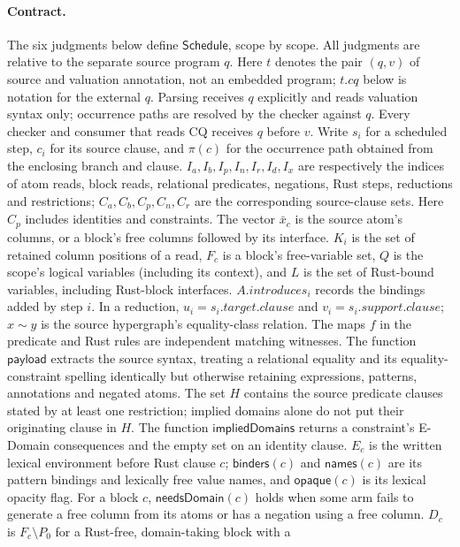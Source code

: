 \paragraph{Contract.}
The six judgments below define $\mathsf{Schedule}$, scope by scope.
All judgments are relative to the separate source program $q$.
Here $t$ denotes the pair $(q,v)$ of source and valuation annotation, not
an embedded program; $t.cq$ below is notation for the external $q$.
Parsing receives $q$ explicitly and reads valuation syntax only; occurrence
paths are resolved by the checker against $q$.
Every checker and consumer that reads CQ receives $q$ before $v$.
Write $s_i$ for a scheduled step, $c_i$ for its source clause, and
$\pi(c)$ for the occurrence path obtained from the enclosing branch and clause.
$I_a,I_b,I_p,I_n,I_r,I_d,I_x$ are respectively the indices of atom reads,
block reads, relational predicates, negations, Rust steps, reductions and
restrictions; $C_a,C_b,C_p,C_n,C_r$ are the corresponding source-clause sets.
Here $C_p$ includes identities and constraints. The vector $\bar x_c$ is the
source atom's columns, or a block's free columns followed by its interface.
$K_i$ is the set of retained column positions of a read, $F_c$ is a block's
free-variable set, $Q$ is the scope's logical variables (including its context),
and $L$ is the set of Rust-bound variables, including Rust-block interfaces.
$A.introduces_i$ records the bindings added by step $i$.
In a reduction, $u_i=s_i.target.clause$ and $v_i=s_i.support.clause$;
$x\sim y$ is the source hypergraph's equality-class relation.
The maps $f$ in the predicate and Rust rules are independent matching witnesses.
The function $\mathsf{payload}$ extracts the source syntax, treating a
relational equality and its equality-constraint spelling identically but
otherwise retaining expressions, patterns, annotations and negated atoms.
The set $H$ contains the source predicate clauses stated by at least one
restriction; implied domains alone do not put their originating clause in $H$.
The function $\mathsf{impliedDomains}$ returns a constraint's E-Domain
consequences and the empty set on an identity clause.
$E_c$ is the written lexical environment before Rust clause $c$;
$\mathsf{binders}(c)$ and $\mathsf{names}(c)$ are its pattern bindings and
lexically free value names, and $\mathsf{opaque}(c)$ is its lexical opacity flag.
For a block $c$, $\mathsf{needsDomain}(c)$ holds when some arm fails to
generate a free column from its atoms or has a negation using a free column.
$D_c$ is $F_c\setminus P_0$ for a Rust-free, domain-taking block with a
